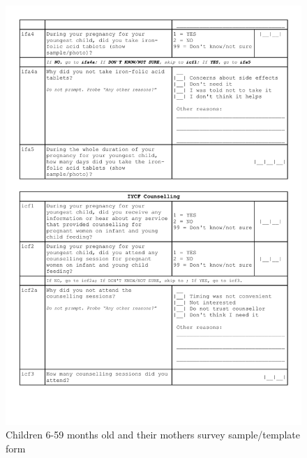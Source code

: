 \documentclass[12pt,a4paper]{book}
\theoremstyle{definition}
\theoremstyle{definition}
\theoremstyle{definition}
\theoremstyle{remark}
\begin{document}
\begin{figure}[H]
{\centering \includegraphics[width=29.15in]{forms/childForm2} 

}

\caption{Children 6-59 months old and their mothers survey sample/template form}\label{fig:childform}
\end{figure}\begin{figure}[H]


\end{figure}
\end{document}
